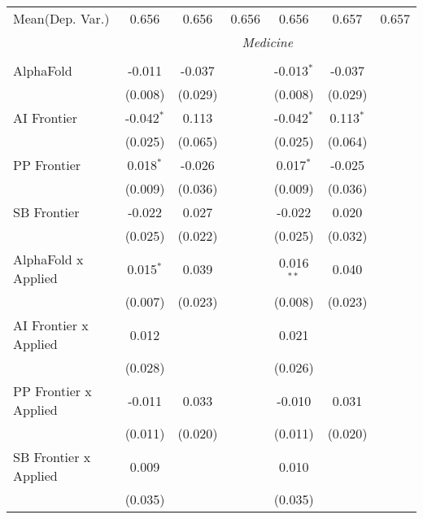 \begin{tabular}{lcccccc}
Mean(Dep. Var.) & 0.656 & 0.656 & 0.656 & 0.656 & 0.657 & 0.657 \\
 & \multicolumn{6}{c}{\textit{Medicine}} \\ \\
   AlphaFold                    & -0.011       & -0.037  &              & -0.013$^{*}$ & -0.037      &   \\   
                                & (0.008)      & (0.029) &              & (0.008)      & (0.029)     &   \\   
   AI Frontier                  & -0.042$^{*}$ & 0.113   &              & -0.042$^{*}$ & 0.113$^{*}$ &   \\   
                                & (0.025)      & (0.065) &              & (0.025)      & (0.064)     &   \\   
   PP Frontier                  & 0.018$^{*}$  & -0.026  &              & 0.017$^{*}$  & -0.025      &   \\   
                                & (0.009)      & (0.036) &              & (0.009)      & (0.036)     &   \\   
   SB Frontier                  & -0.022       & 0.027   &              & -0.022       & 0.020       &   \\   
                                & (0.025)      & (0.022) &              & (0.025)      & (0.032)     &   \\   
   AlphaFold x Applied          & 0.015$^{*}$  & 0.039   &              & 0.016$^{**}$ & 0.040       &   \\   
                                & (0.007)      & (0.023) &              & (0.008)      & (0.023)     &   \\   
   AI Frontier x Applied        & 0.012        &         &              & 0.021        &             &   \\   
                                & (0.028)      &         &              & (0.026)      &             &   \\   
   PP Frontier x Applied        & -0.011       & 0.033   &              & -0.010       & 0.031       &   \\   
                                & (0.011)      & (0.020) &              & (0.011)      & (0.020)     &   \\   
   SB Frontier x Applied        & 0.009        &         &              & 0.010        &             &   \\   
                                & (0.035)      &         &              & (0.035)      &             &   \\   

\end{tabular}
